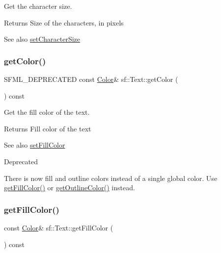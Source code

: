 Get the character size. 

\begin{DoxyReturn}{Returns}
Size of the characters, in pixels
\end{DoxyReturn}
\begin{DoxySeeAlso}{See also}
\hyperlink{classsf_1_1_text_ae96f835fc1bff858f8a23c5b01eaaf7e}{set\+Character\+Size} 
\end{DoxySeeAlso}
\mbox{\label{classsf_1_1_text_a77ba664285efd72ab4ce85b9cbbeeb21}} 
\subsubsection{\texorpdfstring{get\+Color()}{getColor()}}
{\footnotesize\ttfamily S\+F\+M\+L\+\_\+\+D\+E\+P\+R\+E\+C\+A\+T\+ED const \hyperlink{classsf_1_1_color}{Color}\& sf\+::\+Text\+::get\+Color (\begin{DoxyParamCaption}{ }\end{DoxyParamCaption}) const}



Get the fill color of the text. 

\begin{DoxyReturn}{Returns}
Fill color of the text
\end{DoxyReturn}
\begin{DoxySeeAlso}{See also}
\hyperlink{classsf_1_1_text_ab7bb3babac5a6da1802b2c3e1a3e6dcc}{set\+Fill\+Color}
\end{DoxySeeAlso}
\begin{DoxyRefDesc}{Deprecated}
\item[\hyperlink{deprecated__deprecated000018}{Deprecated}]There is now fill and outline colors instead of a single global color. Use \hyperlink{classsf_1_1_text_a6b4ba8c435b59e1e05f831e6230dc537}{get\+Fill\+Color()} or \hyperlink{classsf_1_1_text_a53559d563461089f1172571b375442dc}{get\+Outline\+Color()} instead.\end{DoxyRefDesc}
\mbox{\label{classsf_1_1_text_a6b4ba8c435b59e1e05f831e6230dc537}} 
\subsubsection{\texorpdfstring{get\+Fill\+Color()}{getFillColor()}}
{\footnotesize\ttfamily const \hyperlink{classsf_1_1_color}{Color}\& sf\+::\+Text\+::get\+Fill\+Color (\begin{DoxyParamCaption}{ }\end{DoxyParamCaption}) const}



